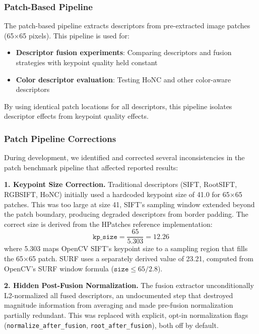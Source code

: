 \subsubsection{Patch-Based Pipeline}

The patch-based pipeline extracts descriptors from pre-extracted image patches (65$\times$65 pixels). This pipeline is used for:
\begin{itemize}
    \item \textbf{Descriptor fusion experiments}: Comparing descriptors and fusion strategies with keypoint quality held constant
    \item \textbf{Color descriptor evaluation}: Testing HoNC and other color-aware descriptors
\end{itemize}

By using identical patch locations for all descriptors, this pipeline isolates descriptor effects from keypoint quality effects.

\subsubsection{Patch Pipeline Corrections}
\label{sec:patch_pipeline_corrections}

During development, we identified and corrected several inconsistencies in the patch benchmark pipeline that affected reported results:

\textbf{1. Keypoint Size Correction.} Traditional descriptors (SIFT, RootSIFT, RGBSIFT, HoNC) initially used a hardcoded keypoint size of 41.0 for 65$\times$65 patches. This was too large at size 41, SIFT's sampling window extended beyond the patch boundary, producing degraded descriptors from border padding. The correct size is derived from the HPatches reference implementation:
\begin{equation}
    \texttt{kp\_size} = \frac{65}{5.303} = 12.26
\end{equation}
where 5.303 maps OpenCV SIFT's keypoint size to a sampling region that fills the 65$\times$65 patch. SURF uses a separately derived value of 23.21, computed from OpenCV's SURF window formula ($\texttt{size} \leq 65 / 2.8$).

\textbf{2. Hidden Post-Fusion Normalization.} The fusion extractor unconditionally L2-normalized all fused descriptors, an undocumented step that destroyed magnitude information from averaging and made pre-fusion normalization partially redundant. This was replaced with explicit, opt-in normalization flags (\texttt{normalize\_after\_fusion}, \texttt{root\_after\_fusion}), both off by default.

